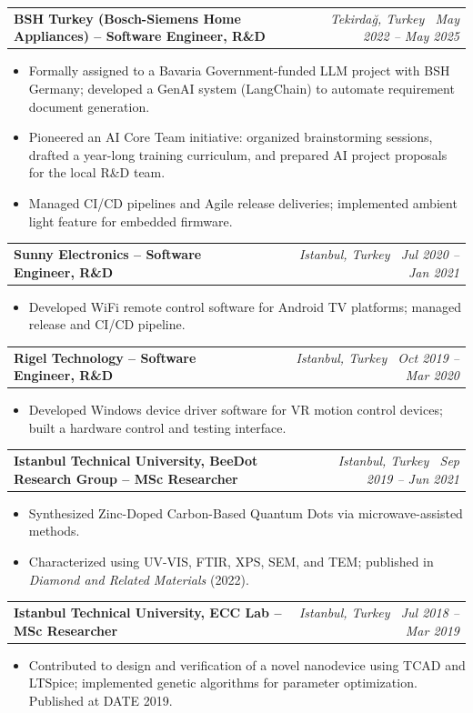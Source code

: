 \documentclass[10.5pt, letterpaper]{moderncv}
\makeatletter
\newcommand{\cvexp}[4]{%
  \vspace{3pt}\par\noindent
  \begin{tabular*}{\textwidth}{@{}l@{\extracolsep{\fill}}r@{}}
    \textbf{#1} & \small\textit{#2 \textendash\ #3}\\
  \end{tabular*}\vspace{-4pt}
  #4\vspace{1pt}%
}
\makeatother
\begin{document}
\cvexp{BSH Turkey (Bosch-Siemens Home Appliances) -- Software Engineer, R\&D}{Tekirda\u{g}, Turkey}{May 2022 -- May 2025}{
  \begin{itemize}
    \item Formally assigned to a Bavaria Government-funded LLM project with BSH Germany; developed a GenAI system (LangChain) to automate requirement document generation.
    \item Pioneered an AI Core Team initiative: organized brainstorming sessions, drafted a year-long training curriculum, and prepared AI project proposals for the local R\&D team.
    \item Managed CI/CD pipelines and Agile release deliveries; implemented ambient light feature for embedded firmware.
  \end{itemize}
}

\cvexp{Sunny Electronics -- Software Engineer, R\&D}{Istanbul, Turkey}{Jul 2020 -- Jan 2021}{
  \begin{itemize}
    \item Developed WiFi remote control software for Android TV platforms; managed release and CI/CD pipeline.
  \end{itemize}
}

\cvexp{Rigel Technology -- Software Engineer, R\&D}{Istanbul, Turkey}{Oct 2019 -- Mar 2020}{
  \begin{itemize}
    \item Developed Windows device driver software for VR motion control devices; built a hardware control and testing interface.
  \end{itemize}
}

\cvexp{Istanbul Technical University, BeeDot Research Group -- MSc Researcher}{Istanbul, Turkey}{Sep 2019 -- Jun 2021}{
  \begin{itemize}
    \item Synthesized Zinc-Doped Carbon-Based Quantum Dots via microwave-assisted methods.
    \item Characterized using UV-VIS, FTIR, XPS, SEM, and TEM; published in \textit{Diamond and Related Materials} (2022).
  \end{itemize}
}

\cvexp{Istanbul Technical University, ECC Lab -- MSc Researcher}{Istanbul, Turkey}{Jul 2018 -- Mar 2019}{
  \begin{itemize}
    \item Contributed to design and verification of a novel nanodevice using TCAD and LTSpice; implemented genetic algorithms for parameter optimization. Published at DATE 2019.
  \end{itemize}
}
\end{document}
